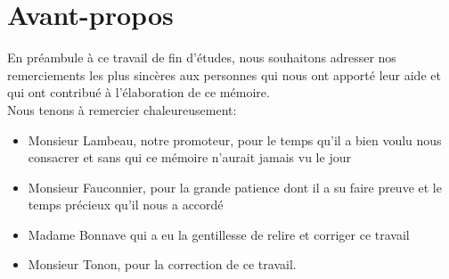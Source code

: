 
\newpage
\chapter*{Avant-propos}
En préambule à ce travail de fin d'études, nous souhaitons adresser nos remerciements les plus sincères aux personnes qui nous ont apporté
leur aide et qui ont contribué à l'élaboration de ce mémoire.\\
\newline
\indent
Nous tenons à remercier chaleureusement:
\begin{itemize}
\item Monsieur Lambeau, notre promoteur, pour le temps qu'il a bien voulu nous consacrer et sans qui ce mémoire n'aurait jamais vu le jour\\

\item Monsieur Fauconnier, pour la grande patience dont il a su faire preuve et le temps précieux qu'il nous a accordé\\
\item Madame Bonnave qui a eu la gentillesse de relire et corriger ce travail\\

\item Monsieur Tonon, pour la correction de ce travail.
\end{itemize}

